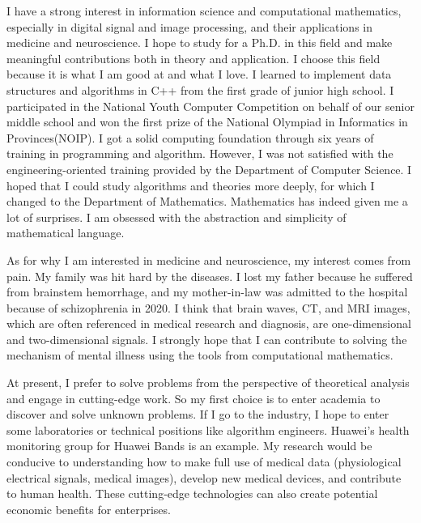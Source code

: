 \documentclass{article}
\numberwithin{equation}{section}
\begin{document}
I have a strong interest in information science and computational mathematics, especially in digital signal and image processing, and their applications in medicine and neuroscience. I hope to study for a Ph.D. in this field and make meaningful contributions both in theory and application. I choose this field because it is what I am good at and what I love. I learned to implement data structures and algorithms in C++ from the first grade of junior high school. I participated in the National Youth Computer Competition on behalf of our senior middle school and won the first prize of the National Olympiad in Informatics in Provinces(NOIP). I got a solid computing foundation through six years of training in programming and algorithm. However, I was not satisfied with the engineering-oriented training provided by the Department of Computer Science. I hoped that I could study algorithms and theories more deeply, for which I changed to the Department of Mathematics. Mathematics has indeed given me a lot of surprises. I am obsessed with the abstraction and simplicity of mathematical language.

As for why I am interested in medicine and neuroscience, my interest comes from pain. My family was hit hard by the diseases. I lost my father because he suffered from brainstem hemorrhage, and my mother-in-law was admitted to the hospital because of schizophrenia in 2020. I think that brain waves, CT, and MRI images, which are often referenced in medical research and diagnosis, are one-dimensional and two-dimensional signals. I strongly hope that I can contribute to solving the mechanism of mental illness using the tools from computational mathematics.

At present, I prefer to solve problems from the perspective of theoretical analysis and engage in cutting-edge work. So my first choice is to enter academia to discover and solve unknown problems. If I go to the industry, I hope to enter some laboratories or technical positions like algorithm engineers. Huawei's health monitoring group for Huawei Bands is an example. My research would be conducive to understanding how to make full use of medical data (physiological electrical signals, medical images), develop new medical devices, and contribute to human health. These cutting-edge technologies can also create potential economic benefits for enterprises.
\end{document}

